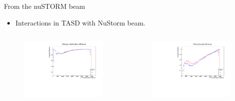 \documentclass[11pt]{beamer}
\begin{document}
\begin{frame}{From the nuSTORM beam}
\begin{block}{}
	\begin{tiny}
		\begin{itemize}
			\item Interactions in TASD with NuStorm beam.
		\end{itemize}
	\end{tiny}
\end{block}
\begin{columns}[T] %
	\begin{column}{.48\textwidth}
		
		\begin{figure}[h!]
			\centering
			\includegraphics[width=\textwidth]{NuStorm/ChargeIDTASDNeutrinoBeamMIND.pdf}
		\end{figure}
	\end{column}%
	\begin{column}{.48\textwidth}
		\begin{figure}[h!]
			\centering
			\includegraphics[width=\textwidth]{NuStorm/FittedTASDNeutrinoBeamMIND.pdf}
		\end{figure}
	\end{column}%
\end{columns}
\end{frame}
\end{document}
